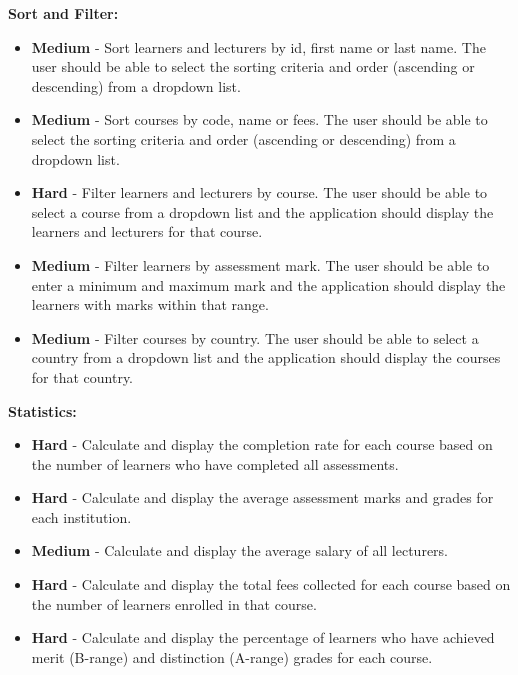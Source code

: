 \documentclass{article}
\begin{document}
\textbf{Sort and Filter:}
\begin{itemize}
    \item \textbf{Medium} - Sort learners and lecturers by id, first name or last name. The user should be able to select the sorting criteria and order (ascending or descending) from a dropdown list.    
    \item \textbf{Medium} - Sort courses by code, name or fees. The user should be able to select the sorting criteria and order (ascending or descending) from a dropdown list.
    \item \textbf{Hard} - Filter learners and lecturers by course. The user should be able to select a course from a dropdown list and the application should display the learners and lecturers for that course.
    \item \textbf{Medium} - Filter learners by assessment mark. The user should be able to enter a minimum and maximum mark and the application should display the learners with marks within that range.
    \item \textbf{Medium} - Filter courses by country. The user should be able to select a country from a dropdown list and the application should display the courses for that country.
\end{itemize}

\textbf{Statistics:}
\begin{itemize}
    \item \textbf{Hard} - Calculate and display the completion rate for each course based on the number of learners who have completed all assessments.
    \item \textbf{Hard} - Calculate and display the average assessment marks and grades for each institution.
    \item \textbf{Medium} - Calculate and display the average salary of all lecturers.
    \item \textbf{Hard} - Calculate and display the total fees collected for each course based on the number of learners enrolled in that course. 
    \item \textbf{Hard} - Calculate and display the percentage of learners who have achieved merit (B-range) and distinction (A-range) grades for each course.
\end{itemize}
\end{document}
